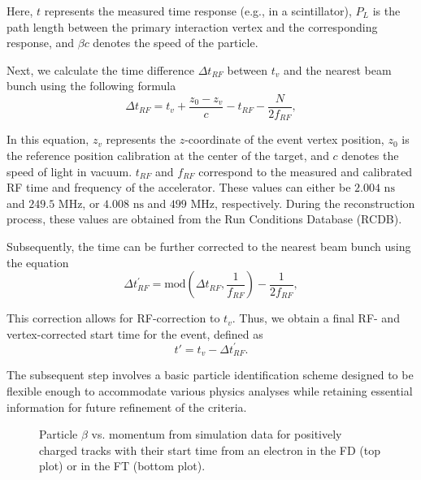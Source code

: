     Here, $t$ represents the measured time response (e.g., in a scintillator), $P_L$ is the path length between the primary interaction vertex and the corresponding response, and $\beta c$ denotes the speed of the particle.

    Next, we calculate the time difference $\Delta t_{RF}$ between $t_v$ and the nearest beam bunch using the following formula
    \begin{equation*}
        \Delta t_{RF} = t_v + \frac{z_0 - z_v}{c} - t_{RF} - \frac{N}{2f_{RF}},
    \end{equation*}

    In this equation, $z_v$ represents the $z$-coordinate of the event vertex position, $z_0$ is the reference position calibration at the center of the target, and $c$ denotes the speed of light in vacuum.
    $t_{RF}$ and $f_{RF}$ correspond to the measured and calibrated RF time and frequency of the accelerator.
    These values can either be $2.004 \text{ ns}$ and $249.5 \text{ MHz}$, or $4.008 \text{ ns}$ and $499 \text{ MHz}$, respectively.
    During the reconstruction process, these values are obtained from the Run Conditions Database (RCDB).

    Subsequently, the time can be further corrected to the nearest beam bunch using the equation
    \begin{equation*}
        \Delta t^\prime_{RF} = \text{mod}\left(\Delta t_{RF}, \frac{1}{f_{RF}}\right) - \frac{1}{2f_{RF}},
    \end{equation*}

    This correction allows for RF-correction to $t_v$. Thus, we obtain a final RF- and vertex-corrected start time for the event, defined as
    \begin{equation*}
        t' = t_v - \Delta t^\prime_{RF}.
    \end{equation*}

    The subsequent step involves a basic particle identification scheme designed to be flexible enough to accommodate various physics analyses while retaining essential information for future refinement of the criteria.

    \begin{wrapfigure}{r}{0.49\textwidth}
        \centering{}
        \caption[Particle $\beta$ vs. momentum for positively charged tracks.]{Particle $\beta$ vs. momentum from simulation data for positively charged tracks with their start time from an electron in the FD (top plot) or in the FT (bottom plot).}
        \label{fig::pos_pid}
    \end{wrapfigure}

